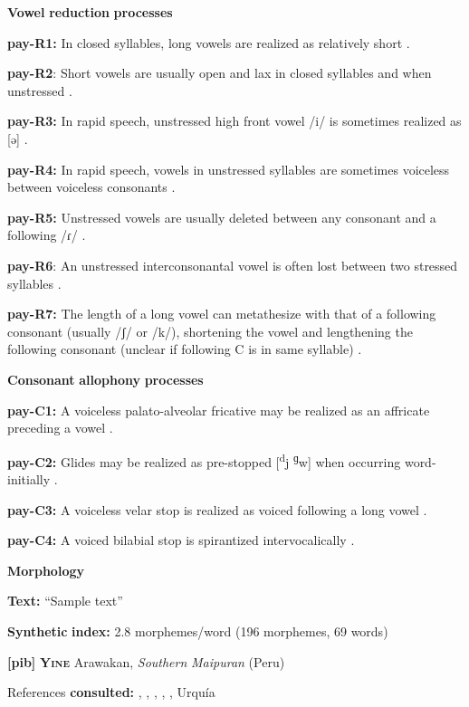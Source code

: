 \begin{styleBody}
\textbf{Vowel} \textbf{reduction} \textbf{processes}

\textbf{pay-R1:} In closed syllables, long vowels are realized as relatively short \citep[18]{Holt1999}.

\textbf{pay-R2}: Short vowels are usually open and lax in closed syllables and when unstressed \citep[18]{Holt1999}.

\textbf{pay-R3:} In rapid speech, unstressed high front vowel /i/ is sometimes realized as [ə] \citep[18]{Holt1999}.

\textbf{pay-R4:} In rapid speech, vowels in unstressed syllables are sometimes voiceless between voiceless consonants \citep[18]{Holt1999}.

\textbf{pay-R5:} Unstressed vowels are usually deleted between any consonant and a following /ɾ/ \citep[23]{Holt1999}.

\textbf{pay-R6}: An unstressed interconsonantal vowel is often lost between two stressed syllables \citep[23]{Holt1999}.

\textbf{pay-R7:} The length of a long vowel can metathesize with that of a following consonant (usually /ʃ/ or /k/), shortening the vowel and lengthening the following consonant (unclear if following C is in same syllable) \citep[24-5]{Holt1999}.

\textbf{Consonant} \textbf{allophony} \textbf{processes}

\textbf{pay-C1:} A voiceless palato-alveolar fricative may be realized as an affricate preceding a vowel \citep[16]{Holt1999}.

\textbf{pay-C2:} Glides may be realized as pre-stopped [\textsuperscript{d}j \textsuperscript{ɡ}w] when occurring word-initially \citep[16]{Holt1999}.

\textbf{pay-C3:} A voiceless velar stop is realized as voiced following a long vowel \citep[15-16]{Holt1999}.

\textbf{pay-C4:} A voiced bilabial stop is spirantized intervocalically \citep[16]{Holt1999}.

\textbf{Morphology}

\textbf{Text:} “Sample text” \citep[79-80]{Holt1999}

\textbf{Synthetic} \textbf{index:} 2.8 morphemes/word (196 morphemes, 69 words)

\textbf{[pib]}   \textbf{\textsc{Yine}}  Arawakan, \textit{Southern} \textit{Maipuran} (Peru)

References \textbf{consulted:} \citet{Hanson2010}, \citet{Lin1993}, \citet{Lin1997}, \citet{Matteson1965}, \citet{Parker1989}, Urquía \citet{SebastiánMarlett2008}


\end{styleBody}
